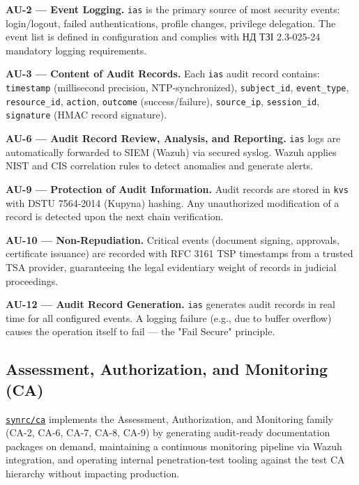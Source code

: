 \documentclass{article}
\begin{document}
\textbf{AU-2 --- Event Logging.}
\texttt{ias} is the primary source of most security events: login/logout, failed authentications, profile changes, privilege delegation. The event list is defined in configuration and complies with \foreignlanguage{ukrainian}{\foreignlanguage{ukrainian}{НД \foreignlanguage{ukrainian}{ТЗІ}} 2.3-025-24} mandatory logging requirements.

\textbf{AU-3 --- Content of Audit Records.}
Each \texttt{ias} audit record contains: \texttt{timestamp} (millisecond precision, NTP-synchronized), \texttt{subject\_id}, \texttt{event\_type}, \texttt{resource\_id}, \texttt{action}, \texttt{outcome} (success/failure), \texttt{source\_ip}, \texttt{session\_id}, \texttt{signature} (HMAC record signature).

\textbf{AU-6 --- Audit Record Review, Analysis, and Reporting.}
\texttt{ias} logs are automatically forwarded to SIEM (Wazuh) via secured syslog. Wazuh applies NIST and CIS correlation rules to detect anomalies and generate alerts.

\textbf{AU-9 --- Protection of Audit Information.}
Audit records are stored in \texttt{kvs} with DSTU 7564-2014 (Kupyna) hashing. Any unauthorized modification of a record is detected upon the next chain verification.

\textbf{AU-10 --- Non-Repudiation.}
Critical events (document signing, approvals, certificate issuance) are recorded with RFC 3161 TSP timestamps from a trusted TSA provider, guaranteeing the legal evidentiary weight of records in judicial proceedings.

\textbf{AU-12 --- Audit Record Generation.}
\texttt{ias} generates audit records in real time for all configured events. A logging failure (e.g., due to buffer overflow) causes the operation itself to fail --- the "Fail Secure" principle.

\subsection{Assessment, Authorization, and Monitoring (CA)}

\href{https://github.com/synrc/ca}{\texttt{synrc/ca}} implements the Assessment, Authorization, and Monitoring family (CA-2, CA-6, CA-7, CA-8, CA-9) by generating audit-ready documentation packages on demand, maintaining a continuous monitoring pipeline via Wazuh integration, and operating internal penetration-test tooling against the test CA hierarchy without impacting production.
\end{document}
